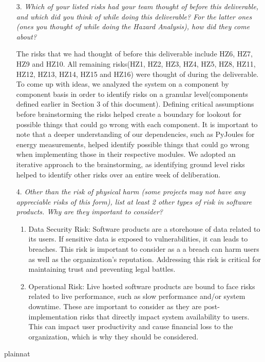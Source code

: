 \documentclass{article}
\begin{document}
\begin{enumerate}
    \item[3.] \textit{Which of your listed risks had your team thought of before this deliverable, and which did you think of while doing this deliverable? For the latter ones (ones you thought of while doing the Hazard Analysis), how did they come about?}

    The risks that we had thought of before this deliverable include  HZ6, HZ7, HZ9 and HZ10. All remaining risks(HZ1, HZ2, HZ3, HZ4, HZ5, HZ8, HZ11, HZ12, HZ13, HZ14, HZ15 and HZ16) were thought of during the deliverable. To come up with ideas, we analyzed the system on a component by component basis in order to identify risks on a granular level(components defined earlier in Section 3 of this document).  Defining critical assumptions before brainstorming the risks helped create a boundary for lookout for possible things that could go wrong with each component. It is important to note that a deeper understanding of our dependencies, such as PyJoules for energy measurements, helped identify possible things that could go wrong when implementing those in their respective modules. We adopted an iterative approach to the brainstorming, as identifying ground level risks helped to identify other risks over an entire week of deliberation.

    \item[4.] \textit{Other than the risk of physical harm (some projects may not have any appreciable risks of this form),
    list at least 2 other types of risk in software products. Why are they important to consider?}

    \begin{enumerate}
        \item Data Security Risk: Software products are a storehouse of data related to its users. If sensitive data is exposed to vulnerabilities, it can leads to breaches. This risk is important to consider as a a breach can harm users as well as the organization’s reputation. Addressing this risk is critical for maintaining trust and preventing legal battles.
        \item Operational Risk: Live hosted software products are bound to face risks related to live performance, such as slow performance and/or system downtime. These are important to consider as they are post-implementation risks that directly impact system availability to users. This can impact user productivity and cause financial loss to the organization, which is why they should be considered.
    \end{enumerate}

\end{enumerate}

 {plainnat}

\end{document}
